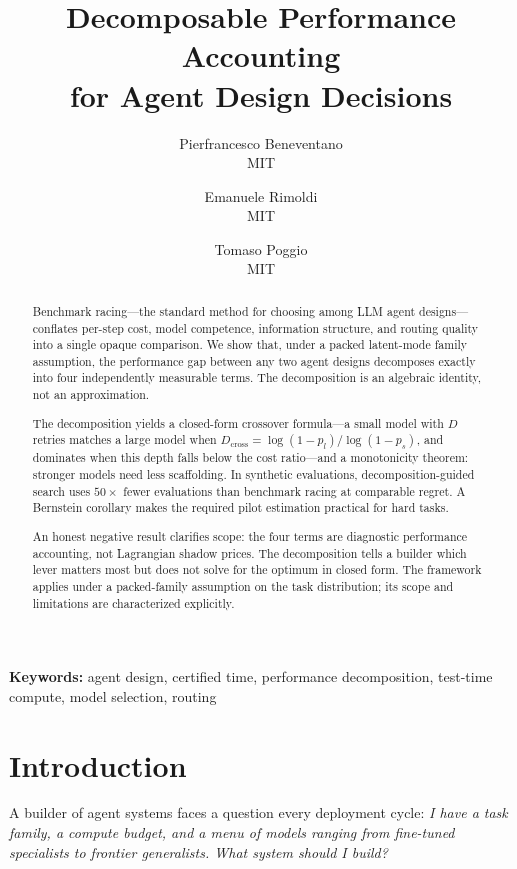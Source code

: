 \documentclass[twoside,11pt]{article}
\title{Decomposable Performance Accounting\\for Agent Design Decisions}
\author{Pierfrancesco Beneventano \\ MIT 
\and Emanuele Rimoldi \\ MIT
\and Tomaso Poggio \\ MIT}
\newenvironment{keywords}{\par\smallskip\noindent\textbf{Keywords: }}{\par\smallskip}
\newcommand{\Dcross}{D_{\mathrm{cross}}}
\begin{document}
\maketitle

\begin{abstract}
Benchmark racing---the standard method for choosing among LLM agent designs---conflates per-step cost, model competence, information structure, and routing quality into a single opaque comparison.
We show that, under a packed latent-mode family assumption, the performance gap between any two agent designs decomposes exactly into four independently measurable terms.
The decomposition is an algebraic identity, not an approximation.

The decomposition yields a closed-form crossover formula---a small model with $D$ retries matches a large model when $\Dcross = \log(1-p_l)/\log(1-p_s)$, and dominates when this depth falls below the cost ratio---and a monotonicity theorem: stronger models need less scaffolding.
In synthetic evaluations, decomposition-guided search uses $50\times$ fewer evaluations than benchmark racing at comparable regret.
A Bernstein corollary makes the required pilot estimation practical for hard tasks.

An honest negative result clarifies scope: the four terms are diagnostic performance accounting, not Lagrangian shadow prices.
The decomposition tells a builder which lever matters most but does not solve for the optimum in closed form.
The framework applies under a packed-family assumption on the task distribution; its scope and limitations are characterized explicitly.
\end{abstract}

\begin{keywords}
agent design, certified time, performance decomposition, test-time compute, model selection, routing
\end{keywords}

\section{Introduction}
\label{sec:intro}

A builder of agent systems faces a question every deployment cycle: \emph{I have a task family, a compute budget, and a menu of models ranging from fine-tuned specialists to frontier generalists.
What system should I build?}
\end{document}
